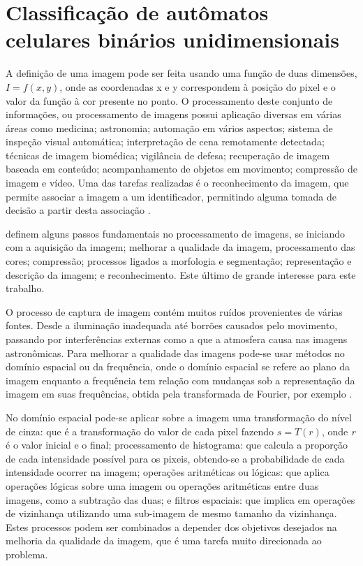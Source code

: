 \documentclass[12pt,a4paper]{report}
\begin{document}
	
	\chapter{Classificação de autômatos celulares binários unidimensionais}
	\label{cap:classificacaoACBinUni}
	
	A definição de uma imagem pode ser feita usando uma função de duas dimensões, $I = f(x, y)$, onde as coordenadas x e y correspondem à posição do pixel e o valor da função à cor presente no ponto. O processamento deste conjunto de informações, ou processamento de imagens possui aplicação diversas em várias áreas como medicina; astronomia; automação em vários aspectos; sistema de inspeção visual automática; interpretação de cena remotamente detectada; técnicas de imagem biomédica; vigilância de defesa; recuperação de imagem baseada em conteúdo; acompanhamento de objetos em movimento; compressão de imagem e vídeo. Uma das tarefas realizadas é o reconhecimento da imagem, que permite associar a imagem a um identificador, permitindo alguma tomada de decisão a partir desta associação \cite{Acharya:2005:IPP:1088917}.
	
	 definem alguns passos fundamentais no processamento de imagens, se iniciando com a aquisição da imagem; melhorar a qualidade da imagem, processamento das cores; compressão; processos ligados a morfologia e segmentação; representação e descrição da imagem; e reconhecimento. Este último de grande interesse para este trabalho.
	
	O processo de captura de imagem contém muitos ruídos provenientes de várias fontes. Desde a iluminação inadequada até borrões causados pelo movimento, passando por interferências externas como a que a atmosfera causa nas imagens astronômicas. Para melhorar a qualidade das imagens pode-se usar métodos no domínio espacial ou da frequência, onde o domínio espacial se refere ao plano da imagem enquanto a frequência tem relação com mudanças sob a representação da imagem em suas frequências, obtida pela transformada de Fourier, por exemplo \cite{Gonzales:1987:DIP:22881}.
	
	No domínio espacial pode-se aplicar sobre a imagem uma transformação do nível de cinza: que é a transformação do valor de cada pixel fazendo $s = T(r)$, onde \textit{r} é o valor inicial e o final; processamento de histograma: que calcula a proporção de cada intensidade possível para os pixeis, obtendo-se a probabilidade de cada intensidade ocorrer na imagem; operações aritméticas ou lógicas: que aplica operações lógicas sobre uma imagem ou operações aritméticas entre duas imagens, como a subtração das duas; e filtros espaciais: que implica em operações de vizinhança utilizando uma sub-imagem de mesmo tamanho da vizinhança. Estes processos podem ser combinados a depender dos objetivos desejados na melhoria da qualidade da imagem, que é uma tarefa muito direcionada ao problema.
	
\end{document}
